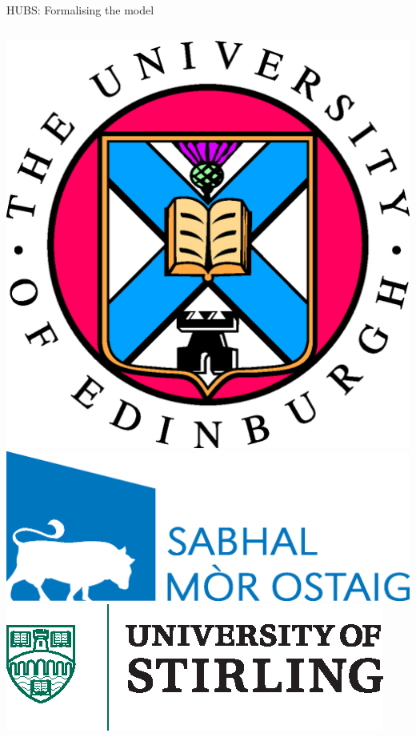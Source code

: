\documentclass{beamer}
\begin{document}
\begin{frame}{HUBS: Formalising the model}
\begin{columns}
\begin{center}
      \includegraphics[height=0.07\textheight]{eushield-fullcolour}
      \hspace{1pt}
      \includegraphics[height=0.07\textheight]{smo-pms-blue}\\
      \vspace{0.25\baselineskip}
      \includegraphics[height=0.07\textheight]{stir-logo-colour}
      \hspace{1pt}

\end{center}
\end{columns}
\end{frame}
\end{document}
